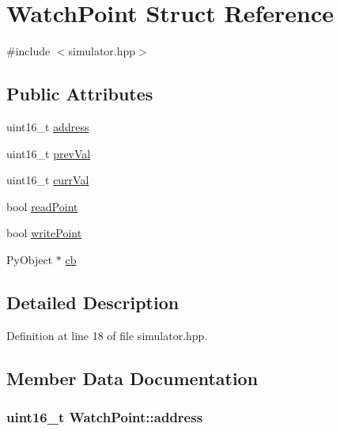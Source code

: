 \hypertarget{struct_watch_point}{\section{Watch\-Point Struct Reference}
\label{struct_watch_point}
}


{\ttfamily \#include $<$simulator.\-hpp$>$}

\subsection*{Public Attributes}
\begin{DoxyCompactItemize}
\item 
uint16\-\_\-t \hyperlink{struct_watch_point_a6a06d058cfef3dcf884cb9b450336e2b}{address}
\item 
uint16\-\_\-t \hyperlink{struct_watch_point_a10522099ca18d8990ed7271eea8ebe9b}{prev\-Val}
\item 
uint16\-\_\-t \hyperlink{struct_watch_point_a034305370c1f202264bde15517161c84}{curr\-Val}
\item 
bool \hyperlink{struct_watch_point_a861bd06fdc7d1344facc41e7c338eb0a}{read\-Point}
\item 
bool \hyperlink{struct_watch_point_ace0077dc7681695fdb7fbc3e44637038}{write\-Point}
\item 
Py\-Object $\ast$ \hyperlink{struct_watch_point_a5f41744f900b3b33e6585bb906e8da25}{cb}
\end{DoxyCompactItemize}


\subsection{Detailed Description}


Definition at line 18 of file simulator.\-hpp.



\subsection{Member Data Documentation}
\hypertarget{struct_watch_point_a6a06d058cfef3dcf884cb9b450336e2b}{
\subsubsection[{address}]{\setlength{\rightskip}{0pt plus 5cm}uint16\-\_\-t Watch\-Point\-::address}}\label{struct_watch_point_a6a06d058cfef3dcf884cb9b450336e2b}


